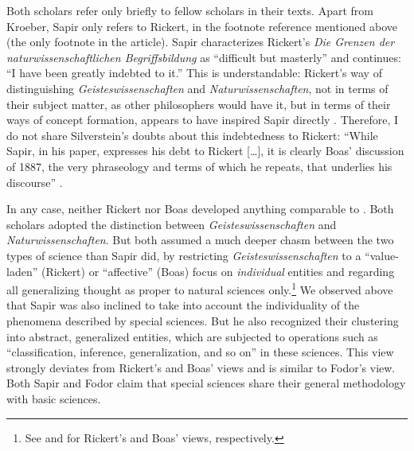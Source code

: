 \documentclass[output=paper]{langscibook}
\begin{document}
Both scholars refer only briefly to fellow scholars in their texts. Apart from Kroeber, Sapir only refers to Rickert, in the footnote reference mentioned above (the only footnote in the article). Sapir characterizes Rickert's \emph{Die Grenzen der naturwissenschaftlichen Begriffsbildung} as ``difficult but masterly'' and continues: ``I have been greatly indebted to it.'' This is understandable: Rickert's way of distinguishing \emph{Geisteswissenschaften} and \emph{Naturwissenschaften}, not in terms of their subject matter, as other philosophers would have it, but in terms of their ways of concept formation, appears to have inspired Sapir directly \citep[cf.][]{Anchor1967}.  Therefore, I do not share Silverstein's doubts about this indebtedness to Rickert: ``While Sapir, in his paper, expresses his debt to Rickert […], it is clearly Boas' discussion of 1887, the very phraseology and terms of which he repeats, that underlies his discourse'' \citep[70, fn.5]{Silverstein1986}.\label{q:elffers:silversteinref}

In any case, neither Rickert nor Boas developed anything comparable to . Both scholars adopted the distinction between \emph{Geisteswissenschaf\-ten} and \emph{Naturwissenschaften}. But both assumed a much deeper chasm between the two types of science than Sapir did, by restricting \emph{Geisteswissenschaften} to a ``value-laden'' (Rickert) or ``affective'' (Boas) focus on \emph{individual} entities and regarding all generalizing thought as proper to natural sciences only.\footnote{See \citet{Anchor1967}  and \citet{Silverstein1986} for Rickert's and Boas' views, respectively.} We observed above that Sapir was also inclined to take into account the individuality of the phenomena described by special sciences. But he also recognized their clustering into abstract, generalized entities, which are subjected to operations such as ``classification, inference, generalization, and so on'' in these sciences. This view strongly deviates from Rickert's and Boas' views and is similar to Fodor's view. Both Sapir and Fodor claim that special sciences share their general methodology with basic sciences.
\end{document}
